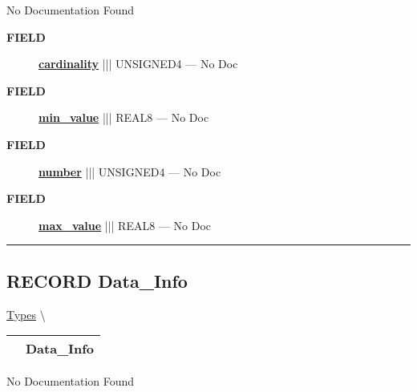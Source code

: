No Documentation Found







\par
\begin{description}
\item [\colorbox{tagtype}{\color{white} \textbf{\textsf{FIELD}}}] \textbf{\underline{cardinality}} ||| UNSIGNED4 --- No Doc
\item [\colorbox{tagtype}{\color{white} \textbf{\textsf{FIELD}}}] \textbf{\underline{min\_value}} ||| REAL8 --- No Doc
\item [\colorbox{tagtype}{\color{white} \textbf{\textsf{FIELD}}}] \textbf{\underline{number}} ||| UNSIGNED4 --- No Doc
\item [\colorbox{tagtype}{\color{white} \textbf{\textsf{FIELD}}}] \textbf{\underline{max\_value}} ||| REAL8 --- No Doc
\end{description}





\rule{\linewidth}{0.5pt}
\subsection*{\textsf{\colorbox{headtoc}{\color{white} RECORD}
Data\_Info}}

\hypertarget{ecldoc:logisticregression.types.data_info}{}
\hspace{0pt} \hyperlink{ecldoc:LogisticRegression.Types}{Types} \textbackslash 

{\renewcommand{\arraystretch}{1.5}
\begin{tabularx}{\textwidth}{|>{\raggedright\arraybackslash}l|X|}
\hline
\hspace{0pt}\mytexttt{\color{red} } & \textbf{Data\_Info} \\
\hline
\end{tabularx}
}

\par





No Documentation Found







